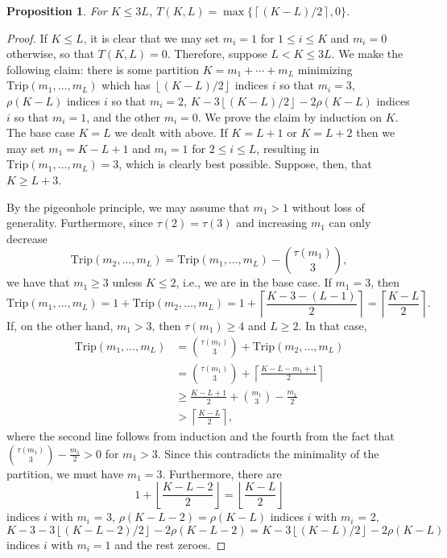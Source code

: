 \documentclass[12pt]{article}
\newtheorem{prop}[theorem]{Proposition}
\newcommand{\floor}[1]{\ensuremath{\left \lfloor {#1} \right \rfloor}}
\newcommand{\ceil}[1]{\ensuremath{\left \lceil {#1} \right \rceil}}
\newcommand{\trip}[1]{\ensuremath{\textrm{Trip} \! \left( {#1} \right )}}
\begin{document}
\begin{prop} \label{KLprop} For $K \leq 3L$, $T(K,L) = \max\{\ceil{(K-L)/2},0\}$.
\end{prop}
\begin{proof} If $K \leq L$, it is clear that we may set $m_i = 1$ for $1 \leq i \leq K$ and $m_i = 0$ otherwise, so that $T(K,L)=0$.  Therefore, suppose $L < K \leq 3L$.  We make the following claim: there is some partition $K = m_1 + \cdots + m_L$ minimizing $\trip{m_1,\ldots,m_L}$ which has $\floor{(K-L)/2}$ indices $i$ so that $m_i = 3$, $\rho(K-L)$ indices $i$ so that $m_i = 2$, $K - 3 \floor{(K-L)/2} - 2 \rho(K-L)$ indices $i$ so that $m_i = 1$, and the other $m_i = 0$.  We prove the claim by induction on $K$.  The base case $K=L$ we dealt with above.  If $K = L+1$ or $K = L+2$ then we may set $m_1 = K - L + 1$ and $m_i = 1$ for $2 \leq i \leq L$, resulting in $\trip{m_1,\ldots,m_L} = 3$, which is clearly best possible.  Suppose, then, that $K \geq L+3$.

By the pigeonhole principle, we may assume that $m_1 > 1$ without loss of generality.  Furthermore, since $\tau(2)=\tau(3)$ and increasing $m_1$ can only decrease
$$
\trip{m_2,\ldots,m_L} = \trip{m_1,\ldots,m_L} - \binom{\tau(m_1)}{3},
$$
we have that $m_1 \geq 3$ unless $K \leq 2$, i.e., we are in the base case.  If $m_1 = 3$, then
$$
\trip{m_1,\ldots,m_L} = 1 + \trip{m_2,\ldots,m_L} = 1 + \ceil{\frac{K-3-(L-1)}{2}} = \ceil{\frac{K-L}{2}}.
$$
If, on the other hand, $m_1 > 3$, then $\tau(m_1) \geq 4$ and $L \geq 2$.  In that case,
\begin{align*}
\trip{m_1,\ldots,m_L} & = \binom{\tau(m_1)}{3} + \trip{m_2,\ldots,m_L} \\
& = \binom{\tau(m_1)}{3} + \ceil{\frac{K-L-m_1+1}{2}} \\
& \geq \frac{K-L+1}{2} + \binom{m_1}{3}  - \frac{m_1}{2} \\
& > \ceil{\frac{K-L}{2}},
\end{align*}
where the second line follows from induction and the fourth from the fact that $\binom{\tau(m_1)}{3}-\frac{m_1}{2} > 0$ for $m_1 > 3$.  Since this contradicts the minimality of the partition, we must have $m_1 = 3$.  Furthermore, there are
$$
1 + \floor{\frac{K-L-2}{2}} = \floor{\frac{K-L}{2}}
$$
indices $i$ with $m_i$ = 3, $\rho(K - L - 2) = \rho(K-L)$ indices $i$ with $m_i$ = 2,
$$
K - 3 - 3 \floor{(K-L-2)/2} - 2 \rho(K-L-2) = K - 3 \floor{(K-L)/2} - 2 \rho(K-L)
$$
indices $i$ with $m_i = 1$ and the rest zeroes.

\end{proof}
\end{document}
